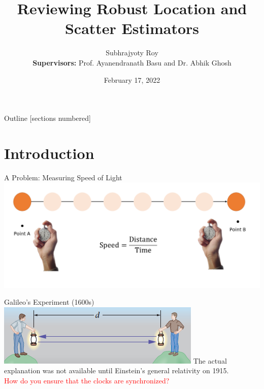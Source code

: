 \documentclass[10pt,xcolor=svgnames]{beamer} %
\title{Reviewing Robust Location and Scatter Estimators}
\author[Name]{Subhrajyoty Roy \inst{$\dagger$} \\ \textbf{Supervisors:} Prof. Ayanendranath Basu and Dr. Abhik Ghosh} %
\institute[uni]{\inst{$\dagger$} External Research Fellow \\ Indian Statistical Institute, Kolkata}
\date{February 17, 2022} %
\begin{document}
{
\maketitle
}%



\begin{frame}{Outline}
  [sections numbered] %
  \tableofcontents[hideallsubsections] %
\end{frame}


\section{Introduction}

\begin{frame}{A Problem: Measuring Speed of Light}
     \includegraphics[width = \textwidth]{images/speed-measure.png}   
\end{frame}

\begin{frame}{Galileo's Experiment (1600s)}
    \includegraphics[width = \textwidth]{images/galelio.png}
    \pause
    The actual explanation was not available until Einstein's general relativity on 1915.\\
    \textcolor{red}{How do you ensure that the clocks are synchronized?}
\end{frame}
\end{document}
